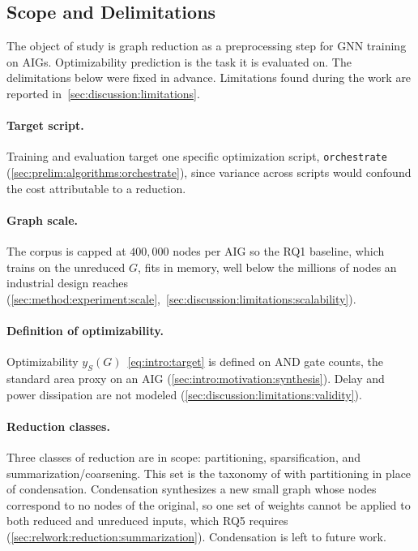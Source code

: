 \subsection{Scope and Delimitations}
\label{sec:intro:rqs:scope}
The object of study is graph reduction as a preprocessing step for GNN training on AIGs.
Optimizability prediction is the task it is evaluated on. The delimitations below were fixed
in advance. Limitations found during the work are reported
in~\ref{sec:discussion:limitations}.

\paragraph{Target script.}
\label{sec:intro:scope:algorithm}
Training and evaluation target one specific optimization script, \texttt{orchestrate}
(\ref{sec:prelim:algorithms:orchestrate}), since variance across scripts would confound the
cost attributable to a reduction.

\paragraph{Graph scale.}
\label{sec:intro:scope:scale}
The corpus is capped at $400{,}000$ nodes per AIG so the RQ1 baseline, which trains on the
unreduced $G$, fits in memory, well below the millions of nodes an industrial design reaches
(\ref{sec:method:experiment:scale},~\ref{sec:discussion:limitations:scalability}).

\paragraph{Definition of optimizability.}
\label{sec:intro:scope:target}
Optimizability $y_S(G)$~\eqref{eq:intro:target} is defined on AND gate counts, the standard
area proxy on an AIG (\ref{sec:intro:motivation:synthesis}). Delay and power dissipation are not modeled
(\ref{sec:discussion:limitations:validity}).

\paragraph{Reduction classes.}
\label{sec:intro:scope:reductions}
Three classes of reduction are in scope: partitioning, sparsification, and
summarization/coarsening. This set is the taxonomy of \citet{hashemi2024survey} with
partitioning in place of condensation. Condensation synthesizes a new small graph whose nodes
correspond to no nodes of the original, so one set of weights cannot be applied to both
reduced and unreduced inputs, which RQ5 requires
(\ref{sec:relwork:reduction:summarization}). Condensation is left to future work.

